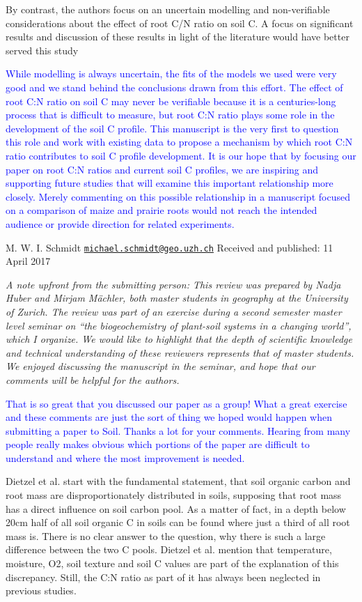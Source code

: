 \documentclass[]{article}
\begin{document}
By contrast, the authors focus on an uncertain modelling and
non-verifiable considerations about the effect of root C/N ratio on soil
C. A focus on significant results and discussion of these results in
light of the literature would have better served this study

\textcolor{blue}{While modelling is always uncertain, the fits of the models we used were very good and we stand behind the conclusions drawn from this effort. The effect of root C:N ratio on soil C may never be verifiable because it is a centuries-long process that is difficult to measure, but root C:N ratio plays some role in the development of the soil C profile. This manuscript is the very first to question this role and work with existing data to propose a mechanism by which root C:N ratio contributes to soil C profile development. It is our hope that by focusing our paper on root C:N ratios and current soil C profiles, we are inspiring and supporting future studies that will examine this important relationship more closely. Merely commenting on this possible relationship in a manuscript focused on a comparison of maize and prairie roots would not reach the intended audience or provide direction for related experiments.}

M. W. I. Schmidt
\href{mailto:michael.schmidt@geo.uzh.ch}{\nolinkurl{michael.schmidt@geo.uzh.ch}}
Received and published: 11 April 2017

\emph{A note upfront from the submitting person: This review was
prepared by Nadja Huber and Mirjam Mächler, both master students in
geography at the University of Zurich. The review was part of an
exercise during a second semester master level seminar on ``the
biogeochemistry of plant-soil systems in a changing world'', which I
organize. We would like to highlight that the depth of scientific
knowledge and technical understanding of these reviewers represents that
of master students. We enjoyed discussing the manuscript in the seminar,
and hope that our comments will be helpful for the authors.}

\textcolor{blue}{That is so great that you discussed our paper as a group! What a great exercise and these comments are just the sort of thing we hoped would happen when submitting a paper to Soil. Thanks a lot for your comments. Hearing from many people really makes obvious which portions of the paper are difficult to understand and where the most improvement is needed.}

Dietzel et al. start with the fundamental statement, that soil organic
carbon and root mass are disproportionately distributed in soils,
supposing that root mass has a direct influence on soil carbon pool. As
a matter of fact, in a depth below 20cm half of all soil organic C in
soils can be found where just a third of all root mass is. There is no
clear answer to the question, why there is such a large difference
between the two C pools. Dietzel et al. mention that temperature,
moisture, O2, soil texture and soil C values are part of the explanation
of this discrepancy. Still, the C:N ratio as part of it has always been
neglected in previous studies.
\end{document}

